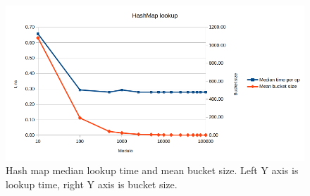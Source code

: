 \documentclass[a4paper,11pt]{article}
\begin{document}
    \begin{figure}[H]
        \centering
        \includegraphics[width=\textwidth]{hashmap.png}
        \caption{Hash map median lookup time and mean bucket size. Left Y axis is lookup time, right Y axis is bucket size.}
        \label{fig:hashmap}
    \end{figure}
\end{document}
